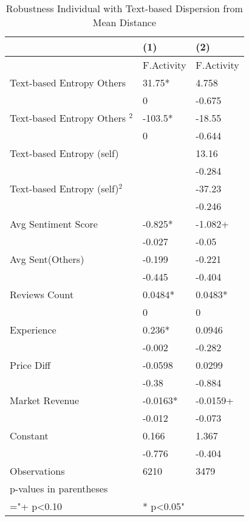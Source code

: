 \begin{table}[]
\centering
\begin{tabular}{@{}lll@{}}
\toprule
 & (1) & (2) \\ \midrule
 & F.Activity & F.Activity \\
Text-based Entropy Others & 31.75* & 4.758 \\
 & 0 & -0.675 \\
Text-based Entropy Others $^2$ & -103.5* & -18.55 \\
 & 0 & -0.644 \\
Text-based Entropy (self) &  & 13.16 \\
 &  & -0.284 \\
Text-based Entropy (self)$^2$ &  & -37.23 \\
 &  & -0.246 \\
Avg Sentiment Score & -0.825* & -1.082+ \\
 & -0.027 & -0.05 \\
Avg Sent(Others) & -0.199 & -0.221 \\
 & -0.445 & -0.404 \\
Reviews Count & 0.0484* & 0.0483* \\
 & 0 & 0 \\
Experience & 0.236* & 0.0946 \\
 & -0.002 & -0.282 \\
Price Diff & -0.0598 & 0.0299 \\
 & -0.38 & -0.884 \\
Market Revenue & -0.0163* & -0.0159+ \\
 & -0.012 & -0.073 \\
Constant & 0.166 & 1.367 \\
 & -0.776 & -0.404 \\
Observations & 6210 & 3479 \\
p-values in parentheses &  &  \\
="+ p\textless{}0.10 & * p\textless{}0.05" &  \\ \bottomrule
\end{tabular}
\caption{Robustness Individual with Text-based Dispersion from Mean Distance}
\label{reg_ind_42}
\end{table}